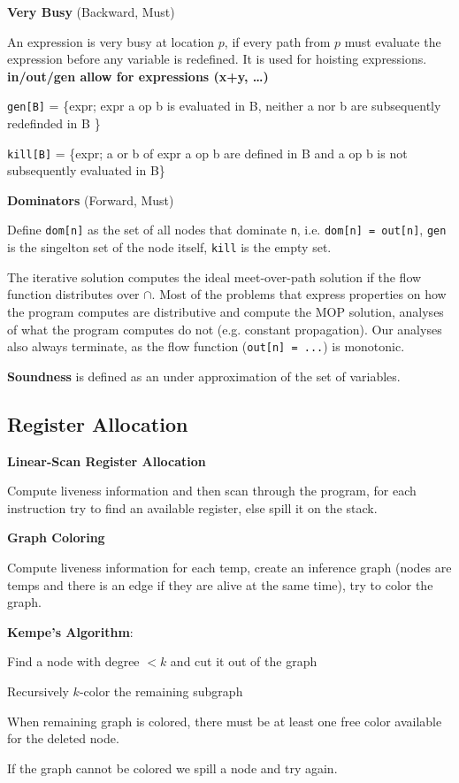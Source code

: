 \textbf{Very Busy} (Backward, Must)\medskip

An expression is very busy at location $p$, if every path from $p$ must evaluate the expression before any variable is redefined.
It is used for hoisting expressions. \textbf{in/out/gen allow for expressions (x+y, \ldots)} \medskip

\texttt{gen[B]} = \{expr; expr a op b is evaluated in B, neither a nor b are subsequently redefinded in B \}\smallskip

\texttt{kill[B]} = \{expr; a or b of expr a op b are defined in B and a op b is not subsequently evaluated in B\} \medskip

\textbf{Dominators} (Forward, Must)\medskip

Define \texttt{dom[n]} as the set of all nodes that dominate \texttt{n}, i.e. \texttt{dom[n] = out[n]}, \texttt{gen} is the singelton set of the node itself, \texttt{kill} is the empty set.\medskip

The iterative solution computes the ideal meet-over-path solution if the flow function distributes over $\cap$. Most of the problems that express properties on how the program computes are distributive and compute the MOP solution, analyses of what the program computes do not (e.g. constant propagation). Our analyses also always terminate, as the flow function (\texttt{out[n] = ...}) is monotonic.\medskip

\textbf{Soundness} is defined as an under approximation of the set of variables.


\subsection*{Register Allocation}

\textbf{Linear-Scan Register Allocation}\medskip

Compute liveness information and then scan through the program, for each instruction try to find an available register, else spill it on the stack.\medskip

\textbf{Graph Coloring}\medskip

Compute liveness information for each temp, create an inference graph (nodes are temps and there is an edge if they are alive at the same time), try to color the graph.\medskip

\textbf{Kempe's Algorithm}:
\begin{compactitem}
	\item Find a node with degree $< k$ and cut it out of the graph
	\item Recursively $k$-color the remaining subgraph
	\item When remaining graph is colored, there must be at least one free color available for the deleted node.
	\item If the graph cannot be colored we spill a node and try again.
\end{compactitem}\medskip

